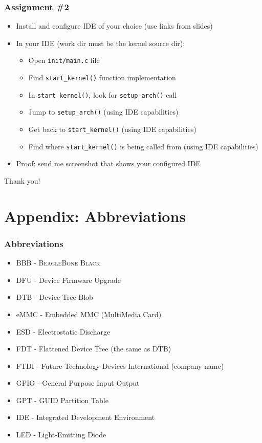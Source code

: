 \begin{frame}
  \frametitle{Assignment \#2}
  \begin{itemize}
    \item Install and configure IDE of your choice (use links from slides)
    \item In your IDE (work dir must be the kernel source dir):
      \begin{itemize}
      \item Open \texttt{init/main.c} file
      \item Find \texttt{start\_kernel()} function implementation
      \item In \texttt{start\_kernel()}, look for \texttt{setup\_arch()} call
      \item Jump to \texttt{setup\_arch()} (using IDE capabilities)
      \item Get back to \texttt{start\_kernel()} (using IDE capabilities)
      \item Find where \texttt{start\_kernel()} is being called from (using IDE
            capabilities)
      \end{itemize}
    \item Proof: send me screenshot that shows your configured IDE
  \end{itemize}
\end{frame}

\begin{frame}[standout]
  Thank you!
\end{frame}

\section*{Appendix: Abbreviations}

\begin{frame}
  \frametitle{Abbreviations}
  \begin{itemize}
    \item BBB - \textsc{BeagleBone Black}
    \item DFU - Device Firmware Upgrade
    \item DTB - Device Tree Blob
    \item eMMC - Embedded MMC (MultiMedia Card)
    \item ESD - Electrostatic Discharge
    \item FDT - Flattened Device Tree (the same as DTB)
    \item FTDI - Future Technology Devices International (company name)
    \item GPIO - General Purpose Input Output
    \item GPT - GUID Partition Table
    \item IDE - Integrated Development Environment
    \item LED - Light-Emitting Diode
  \end{itemize}
\end{frame}

